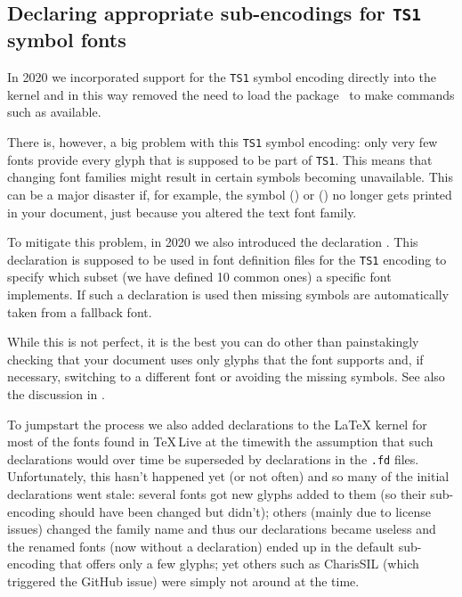\documentclass{ltnews}
\providecommand\Dash {\unskip \textemdash}
\providecommand\TL{\TeX\,Live}
\begin{document}
\subsection{Declaring appropriate sub-encodings for \texttt{TS1} symbol fonts}

In 2020 we incorporated support for the \texttt{TS1} symbol encoding
directly into the kernel and in this way removed the need to load the
 package~\cite{39:ltnews31} to make commands such as
 available.

There is, however, a big problem with this \texttt{TS1} symbol
encoding: only very few fonts provide every glyph that is supposed
to be part of \texttt{TS1}. This means that changing font families
might result in certain symbols becoming unavailable. This can be a
major disaster if, for example,
the symbol  (\texteuro) or  (\textohm)
no longer gets printed in your document, just because you altered the
text font family.

To mitigate this problem, in 2020 we also introduced the declaration
. This declaration is supposed to be used in
font definition files for the \texttt{TS1} encoding to specify which
subset (we have defined 10 common ones) a specific font implements. If
such a declaration is used then missing symbols are automatically
taken from a fallback font.

While this is not perfect, it is the best
you can do other than painstakingly checking that your document
uses only glyphs that the font supports
and, if necessary, switching to a different font or avoiding the
missing symbols. See also the discussion in \cite{39:ltnews33}.

To jumpstart the process we also added declarations to the \LaTeX{}
kernel for most of the fonts found in \TL{} at the time\Dash with
the assumption that such declarations would over time be superseded by
declarations in the \texttt{.fd} files. Unfortunately, this hasn't
happened yet (or not often) and so many of the initial declarations
went stale: several fonts got new glyphs added to them (so their
sub-encoding should have been changed but didn't); others (mainly due
to license issues) changed the family name and thus our declarations
became useless and the renamed fonts (now without a declaration) ended
up in the default sub-encoding that offers only a few glyphs;
yet others such as CharisSIL (which triggered the GitHub issue) were
simply not around at the time.
\end{document}
